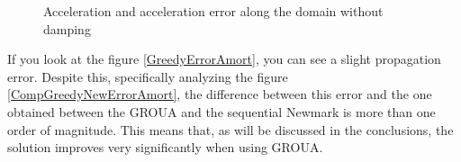 \documentclass{ws-m3as}
\begin{document}


\begin{figure}
 \centering
 \caption{Acceleration and acceleration error along the domain without damping}
 \label{AccVSDivAmort2}
\end{figure}

If you look at the figure \ref{GreedyErrorAmort}, you can see a slight propagation error. Despite this, specifically analyzing the figure \ref{CompGreedyNewErrorAmort}, the difference between this error and the one obtained between the GROUA and the sequential Newmark is more than one order of magnitude.
This means that, as will be discussed in the conclusions, the solution improves very significantly when using GROUA.
\end{document}
